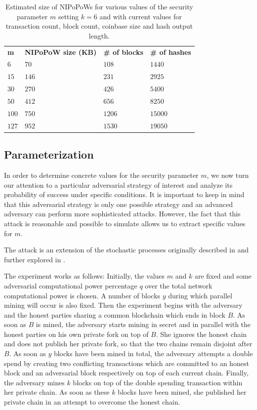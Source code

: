 \begin{table}
  \caption{\label{table.size}
    Estimated size of NIPoPoWs for various values of the security parameter $m$
    setting $k = 6$ and with current values for transaction count, block count,
    coinbase size and hash output length.}
  \begin{tabular}{llll}
      {\bf m}  & {\bf NIPoPoW size (KB)} & {\bf \# of blocks} & {\bf
      \# of hashes}\\
      $6$   & $70$  & $108$ & $1440$  \\
      $15$  & $146$ & $231$ & $2925$  \\
      $30$  & $270$ & $426$ & $5400$  \\
      $50$  & $412$ & $656$ & $8250$ \\
      $100$ & $750$ & $1206$ & $15000$ \\
      $127$ & $952$ & $1530$ & $19050$ \\
  \end{tabular}
\end{table}


\subsection{Parameterization}
In order to determine concrete values for the security parameter $m$, we now
turn our attention to a particular adversarial strategy of interest and analyze
its probability of success under specific conditions. It is important to keep
in mind that this adversarial strategy is only one possible strategy and an
advanced adversary can perform more sophisticated attacks. However, the fact
that this attack is reasonable and possible to simulate allows us to extract
specific values for $m$.

The attack is an extension of the stochastic processes originally described in
\cite{bitcoin} and further explored in \cite{rosenfeld}.

The experiment works as follows: Initially, the values $m$ and $k$ are fixed
and some adversarial computational power percentage $q$ over the total network
computational power is chosen. A number of blocks $y$ during which parallel
mining will occur is also fixed. Then the experiment begins with the adversary
and the honest parties sharing a common blockchain which ends in block $B$. As
soon as $B$ is mined, the adversary starts mining in secret and in parallel
with the honest parties on his own private fork on top of $B$. She ignores the
honest chain and does not publish her private fork, so that the two chains
remain disjoint after $B$. As soon as $y$ blocks have been mined in total, the
adversary attempts a double spend by creating two conflicting transactions
which are committed to an honest block and an adversarial block respectively on
top of each current chain. Finally, the adversary mines $k$ blocks on top of
the double spending transaction within her private chain. As soon as these $k$
blocks have been mined, she published her private chain in an attempt to
overcome the honest chain.

